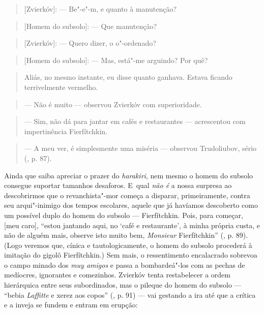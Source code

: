 \begin{quote}
{[}Zvierkóv{]}: --- Be"-e"-m, e quanto à manutenção?
\end{quote}

\begin{quote}
{[}Homem do subsolo{]}: --- Que manutenção?
\end{quote}

\begin{quote}
{[}Zvierkóv{]}: --- Quero dizer, o o"-ordenado?
\end{quote}

\begin{quote}
{[}Homem do subsolo{]}: --- Mas, está"-me arguindo? Por quê?
\end{quote}

\begin{quote}
Aliás, no mesmo instante, eu disse quanto ganhava. Estava ficando
terrivelmente vermelho.
\end{quote}

\begin{quote}
--- Não é muito --- observou Zvierkóv com superioridade.
\end{quote}

\begin{quote}
--- Sim, não dá para jantar em cafés e restaurantes --- acrescentou com
impertinência Fierfítchkin.
\end{quote}

\begin{quote}
--- A meu ver, é simplesmente uma miséria --- observou Trudoliubov, sério
(, p. 87).
\end{quote}

Ainda que saiba apreciar o prazer do \emph{harakiri}, nem mesmo o homem
do subsolo consegue suportar tamanhos desaforos. E~qual \emph{não é} a
nossa surpresa ao descobrirmos que o revanchista"-mor começa a disparar,
primeiramente, contra seu arqui"-inimigo dos tempos escolares, aquele que
já havíamos descoberto como um possível duplo do homem do subsolo ---
Fierfítchkin. Pois, para começar, {[}meu caro{]}, ``estou jantando aqui,
no `café e restaurante', à minha própria custa, e não de alguém mais,
observe isto muito bem, \emph{Monsieur} Fierfítchkin'' (, p. 89).
(Logo veremos que, cínica e tautologicamente, o homem do subsolo
procederá à imitação do gigolô Fierfítchkin.) Sem mais, o ressentimento
encalacrado sobrevoa o campo minado dos \emph{muy amigos} e passa a
bombardeá"-los com as pechas de medíocres, ignorantes e comezinhos.
Zvierkóv tenta restabelecer a ordem hierárquica entre seus subordinados,
mas o pileque do homem do subsolo --- ``bebia \emph{Laffitte} e xerez aos
copos'' (, p. 91) --- vai gestando a ira até que a crítica e a inveja
se fundem e entram em erupção:

